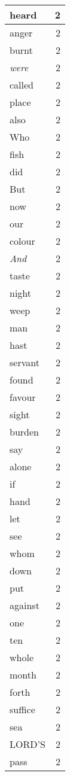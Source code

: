 \begin{center}
\begin{longtable}{l|r}
heard & 2 \\ \hline
anger & 2 \\ \hline
burnt & 2 \\ \hline
\emph{were} & 2 \\ \hline
called & 2 \\ \hline
place & 2 \\ \hline
also & 2 \\ \hline
Who & 2 \\ \hline
fish & 2 \\ \hline
did & 2 \\ \hline
But & 2 \\ \hline
now & 2 \\ \hline
our & 2 \\ \hline
colour & 2 \\ \hline
\emph{And} & 2 \\ \hline
taste & 2 \\ \hline
night & 2 \\ \hline
weep & 2 \\ \hline
man & 2 \\ \hline
hast & 2 \\ \hline
servant & 2 \\ \hline
found & 2 \\ \hline
favour & 2 \\ \hline
sight & 2 \\ \hline
burden & 2 \\ \hline
say & 2 \\ \hline
alone & 2 \\ \hline
if & 2 \\ \hline
hand & 2 \\ \hline
let & 2 \\ \hline
see & 2 \\ \hline
whom & 2 \\ \hline
down & 2 \\ \hline
put & 2 \\ \hline
against & 2 \\ \hline
one & 2 \\ \hline
ten & 2 \\ \hline
whole & 2 \\ \hline
month & 2 \\ \hline
forth & 2 \\ \hline
suffice & 2 \\ \hline
sea & 2 \\ \hline
LORD'S & 2 \\ \hline
pass & 2 \\ \hline

\end{longtable}
\end{center}
